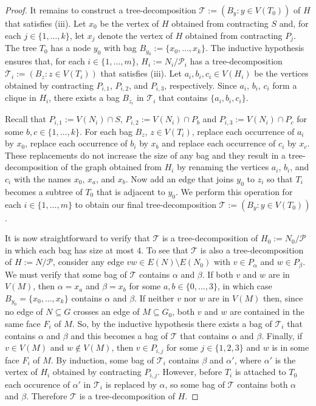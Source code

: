 \documentclass{patmorin}
\theoremstyle{plain}
\theoremstyle{definition}
\begin{document}
\begin{proof}
  It remains to construct a tree-decomposition $\mathcal{T}:=(B_y:y\in V(T_0))$ of $H$ that satisfies (iii). Let $x_0$ be the vertex of $H$ obtained from contracting $S$ and, for each $j\in\{1,\ldots,k\}$, let $x_j$ denote the vertex of $H$ obtained from contracting $P_j$.  The tree $T_0$ has a node $y_0$ with bag $B_{y_0}:=\{x_0,\ldots,x_k\}$. The inductive hypothesis ensures that, for each $i\in\{1,\ldots,m\}$,  $H_i:=N_i/\mathcal{P}_i$ has a tree-decomposition $\mathcal{T}_i:=(B_z:z\in V(T_i))$ that satisfies (iii).  Let $a_i,b_i,c_i\in V(H_i)$ be the vertices obtained by contracting $P_{i,1}$, $P_{i,2}$, and $P_{i,3}$, respectively. Since $a_i$, $b_i$, $c_i$ form a clique in $H_i$, there exists a bag $B_{z_i}$ in $\mathcal{T}_i$ that contains $\{a_i,b_i,c_i\}$.

  Recall that $P_{i,1}:=V(N_i)\cap S$, $P_{i,2}:=V(N_i)\cap P_b$ and $P_{i,3}:=V(N_i)\cap P_c$ for some $b,c\in\{1,\ldots,k\}$.  For each bag $B_z$, $z\in V(T_i)$, replace each occurrence of $a_i$ by $x_0$, replace each occurrence of $b_i$ by $x_b$ and replace each occurrence of $c_i$ by $x_c$.  These replacements do not increase the size of any bag and they result in a tree-decomposition of the graph obtained from $H_i$ by renaming the vertices $a_i$, $b_i$, and $c_i$ with the names $x_0$, $x_a$, and $x_b$. Now add an edge that joins $y_0$ to $z_i$ so that $T_i$ becomes a subtree of $T_0$ that is adjacent to $y_0$.  We perform this operation for each $i\in\{1,\ldots,m\}$ to obtain our final tree-decomposition $\mathcal{T}:=(B_y:y\in V(T_0))$.

  It is now straightforward to verify that $\mathcal{T}$ is a tree-decomposition of $H_0:=N_0/\mathcal{P}$ in which each bag has size at most $4$.    To see that $\mathcal{T}$ is also a tree-decomposition of $H:=N/\mathcal{P}$, consider any edge $vw\in E(N)\setminus E(N_0)$ with $v\in P_\alpha$ and $w\in P_\beta$.  We must verify that some bag of $\mathcal{T}$ contains $\alpha$ and $\beta$.  If both $v$ and $w$ are in $V(M)$, then $\alpha=x_a$ and $\beta=x_b$ for some $a,b\in\{0,\ldots,3\}$, in which case $B_{y_0}=\{x_0,\ldots,x_k\}$ contains $\alpha$ and $\beta$.  If neither $v$ nor $w$ are in $V(M)$ then, since no edge of $N\subseteq G$ crosses an edge of $M\subseteq G_0$, both $v$ and $w$ are contained in the same face $F_i$ of $M$. So, by the inductive hypothesis there exists a bag of $\mathcal{T}_i$ that contains $\alpha$ and $\beta$ and this becomes a bag of $\mathcal{T}$ that contains $\alpha$ and $\beta$.  Finally, if $v\in V(M)$ and $w\not\in V(M)$, then $v\in P_{i,j}$ for some $j\in\{1,2,3\}$ and $w$ is in some face $F_i$ of $M$. By induction, some bag of $\mathcal{T}_i$ contains $\beta$ and $\alpha'$, where $\alpha'$ is the vertex of $H_i$ obtained by contracting $P_{i,j}$.  However, before $T_i$ is attached to $T_0$ each occurence of $\alpha'$ in $\mathcal{T}_i$ is replaced by $\alpha$, so some bag of $\mathcal{T}$ contains both $\alpha$ and $\beta$. Therefore $\mathcal{T}$ is a tree-decomposition of $H$.


\end{proof}
\end{document}
